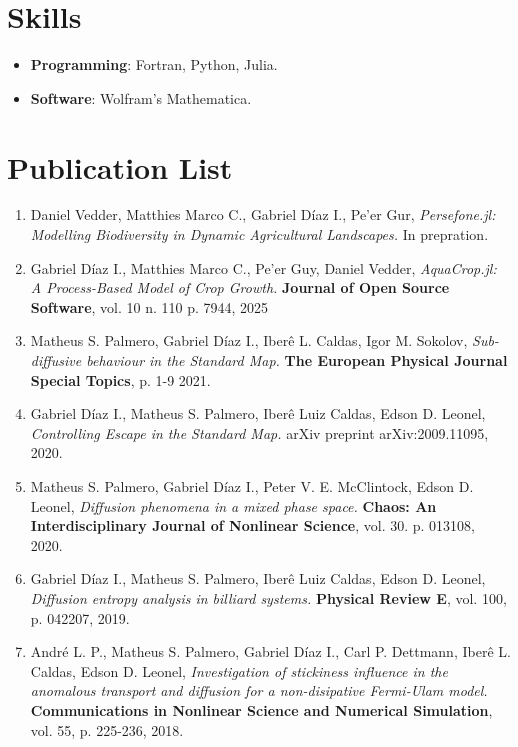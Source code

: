 \documentclass[margin,line]{resume}
\begin{document}
\begin{resume}
\section{\mysidestyle Skills}
\begin{itemize}
     \item {\bf Programming}: Fortran, Python, Julia.
     \item {\bf Software}: Wolfram's Mathematica.
\end{itemize}

    \section{\mysidestyle Publication List}
\begin{enumerate}

\item Daniel Vedder, Matthies Marco C., Gabriel D\'iaz I., Pe'er Gur, {\it Persefone.jl: Modelling Biodiversity in Dynamic Agricultural Landscapes.} In prepration.

\item Gabriel D\'iaz I., Matthies Marco C., Pe'er Guy, Daniel Vedder, {\it AquaCrop.jl: A Process-Based Model of Crop Growth.} {\bf Journal of Open Source Software}, vol. 10 n. 110 p. 7944, 2025 

\item Matheus S. Palmero, Gabriel D\'iaz I., Iber\^e L. Caldas, Igor M. Sokolov, {\it Sub-diffusive behaviour in the Standard Map.} {\bf The European Physical Journal Special Topics}, p. 1-9 2021.

\item Gabriel D\'iaz I., Matheus S. Palmero, Iber\^e Luiz Caldas, Edson D. Leonel, {\it Controlling Escape in the Standard Map.} arXiv preprint arXiv:2009.11095, 2020.

\item Matheus S. Palmero, Gabriel D\'iaz I., Peter V. E. McClintock, Edson D. Leonel, {\it Diffusion phenomena in a mixed phase space.} {\bf Chaos: An Interdisciplinary Journal of Nonlinear Science}, vol. 30. p. 013108, 2020.

\item Gabriel D\'iaz I., Matheus S. Palmero, Iber\^e Luiz Caldas, Edson D. Leonel, {\it Diffusion entropy analysis in billiard systems.} {\bf Physical Review E}, vol. 100, p. 042207, 2019.

\item Andr\'e L. P., Matheus S. Palmero, Gabriel D\'iaz I., Carl P. Dettmann, Iber\^e L. Caldas, Edson D. Leonel, {\it Investigation of stickiness influence in the anomalous transport and diffusion for a non-disipative Fermi-Ulam model.} {\bf Communications in Nonlinear Science and Numerical Simulation}, vol. 55, p. 225-236, 2018.


\end{enumerate}
\end{resume}
\end{document}
